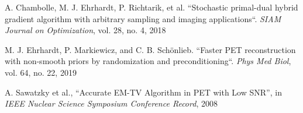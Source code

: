\documentclass[10pt,twocolumn,twoside,letterpaper]{IEEEtran}
\begin{document}
\begin{thebibliography}{00}
A. Chambolle, M. J. Ehrhardt, P. Richtarik, et al. 
``Stochastic primal-dual hybrid gradient algorithm with arbitrary sampling and imaging
applications``. 
\textit{SIAM Journal on Optimization}, vol. 28, no. 4, 2018

 M. J. Ehrhardt, P. Markiewicz, and C. B. Sch\"onlieb. 
``Faster PET reconstruction with non-smooth priors by randomization and preconditioning``. 
\textit{Phys Med Biol}, vol. 64, no. 22, 2019

 A. Sawatzky et al.,
``Accurate EM-TV Algorithm in PET with Low SNR'',
in \textit{IEEE Nuclear Science Symposium Conference Record}, 2008
\end{thebibliography}
\end{document}
